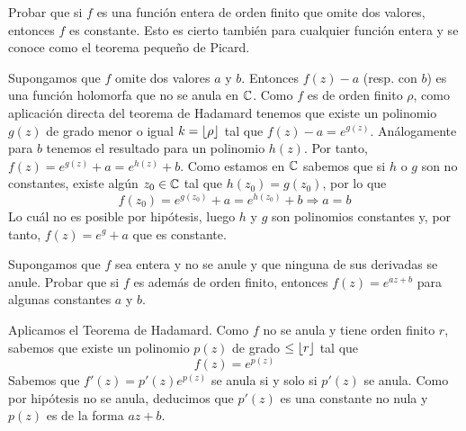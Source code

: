 \documentclass[twoside]{article}
\begin{document}
\newpage

\begin{ejercicio}{4}
Probar que si $f$ es una función entera de orden finito que omite dos valores, entonces $f$ es constante. Esto es cierto también para cualquier función entera y se conoce como el teorema pequeño de Picard.
\end{ejercicio}
\begin{solucion}
Supongamos que $f$ omite dos valores $a$ y $b$. Entonces $f(z)-a$ (resp. con $b$) es una función holomorfa que no se anula en $\mathbb{C}$. Como $f$ es de orden finito $\rho$, como aplicación directa del teorema de Hadamard tenemos que existe un polinomio $g(z)$ de grado menor o igual $k=\left\lfloor{\rho}\right\rfloor$ tal que $f(z)-a=e^{g(z)}$. Análogamente para $b$ tenemos el resultado para un polinomio $h(z)$. Por tanto, $f(z)=e^{g(z)}+a=e^{h(z)}+b$. Como estamos en $\mathbb{C}$ sabemos que si $h$ o $g$ son no constantes, existe algún $z_0\in \mathbb{C}$ tal que $h(z_0)=g(z_0)$, por lo que 
$$
f(z_0) = e^{g(z_0)}+a=e^{h(z_0)}+b \Rightarrow a = b
$$
Lo cuál no es posible por hipótesis, luego $h$ y $g$ son polinomios constantes y, por tanto, $f(z)=e^{g}+a$ que es constante.
\end{solucion}

\newpage


\begin{ejercicio}{5}
Supongamos que $f$ sea entera y no se anule y que ninguna de sus derivadas se anule. Probar que si $f$ es además de orden finito, entonces $f(z)=e^{az+b}$ para algunas constantes $a$ y $b$.
\end{ejercicio}
\begin{solucion}
Aplicamos el Teorema de Hadamard. Como $f$ no se anula y tiene orden finito $r$, sabemos que existe un polinomio $p(z)$ de grado $\leq \left\lfloor{r}\right\rfloor$ tal que
$$
f(z)=e^{p(z)}
$$
Sabemos que $f'(z)=p'(z)e^{p(z)}$ se anula si y solo si $p'(z)$ se anula. Como por hipótesis no se anula, deducimos que $p'(z)$ es una constante no nula y $p(z)$ es de la forma $az+b$.
\end{solucion}
\newpage
\end{document}
